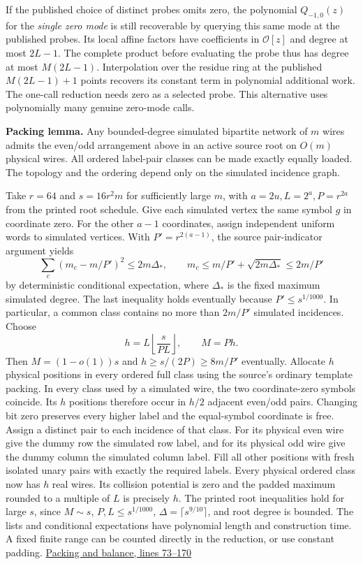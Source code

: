 \documentclass[11pt,a4paper]{article}
\begin{document}
If the published choice of distinct probes omits zero, the polynomial
\(Q_{-1,0}(z)\) for the \emph{single zero mode} is still recoverable by
querying this same mode at the published probes. Its local affine
factors have coefficients in \(\mathcal O[z]\) and degree at most
\(2L-1\). The complete product before evaluating the probe thus has
degree at most \(M(2L-1)\). Interpolation over the residue ring at the
published \(M(2L-1)+1\) points recovers its constant term in polynomial
additional work. The one-call reduction needs zero as a selected probe.
This alternative uses polynomially many genuine zero-mode calls.

\textbf{Packing lemma.} Any bounded-degree simulated bipartite network
of \(m\) wires admits the even/odd arrangement above in an active source
root on \(O(m)\) physical wires. All ordered label-pair classes can be
made exactly equally loaded. The topology and the ordering depend only
on the simulated incidence graph.

Take \(r=64\) and \(s=16r^2m\) for sufficiently large \(m\), with
\(a=2u,L=2^a,P=r^{2a}\) from the printed root schedule. Give each
simulated vertex the same symbol \(g\) in coordinate zero. For the other
\(a-1\) coordinates, assign independent uniform words to simulated
vertices. With \(P'=r^{2(a-1)}\), the source pair-indicator argument
yields \[
       \sum_c (m_c-m/P')^2\le 2m\Delta_*,\qquad
       m_c\le m/P'+\sqrt{2m\Delta_*}\le2m/P'
\tag{A2}
\] by deterministic conditional expectation, where \(\Delta_*\) is the
fixed maximum simulated degree. The last inequality holds eventually
because \(P'\le s^{1/1000}\). In particular, a common class contains no
more than \(2m/P'\) simulated incidences. Choose \[
       h=L\left\lfloor\frac{s}{PL}\right\rfloor,\qquad M=Ph .
\] Then \(M=(1-o(1))s\) and \(h\ge s/(2P)\ge8m/P'\) eventually. Allocate
\(h\) physical positions in every ordered full class using the source's
ordinary template packing. In every class used by a simulated wire, the
two coordinate-zero symbols coincide. Its \(h\) positions therefore
occur in \(h/2\) adjacent even/odd pairs. Changing bit zero preserves
every higher label and the equal-symbol coordinate is free. Assign a
distinct pair to each incidence of that class. For its physical even
wire give the dummy row the simulated row label, and for its physical
odd wire give the dummy column the simulated column label. Fill all
other positions with fresh isolated unary pairs with exactly the
required labels. Every physical ordered class now has \(h\) real wires.
Its collision potential is zero and the padded maximum rounded to a
multiple of \(L\) is precisely \(h\). The printed root inequalities hold
for large \(s\), since \(M\sim s\), \(P,L\le s^{1/1000}\),
\(\Delta=\lceil s^{9/10}\rceil\), and root degree is bounded. The lists
and conditional expectations have polynomial length and construction
time. A fixed finite range can be counted directly in the reduction, or
use constant padding.
\href{https://github.com/openai/math/blob/main/preprints/The-Exponential-Time-Hypothesis-is-False-October-25-2026/build/quantitative-contraction.tex\#L73}{Packing
and balance, lines 73--170}
\end{document}
